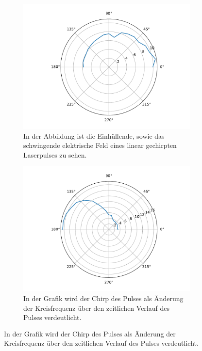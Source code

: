             \FloatBarrier
            \begin{figure}[ht]
                \centering
                \begin{subfigure}[b]{0.45\textwidth}
                    \centering
                    \includegraphics[scale=0.3]{./pictures/H_mol_resonanz_1_2307Hz.pdf}
                    \caption{In der Abbildung ist die Einhüllende, sowie das schwingende elektrische Feld eines linear gechirpten Laserpulses zu sehen.}
                    \label{fig:H_mol_resonanz_1_2307Hz}
                \end{subfigure}
                \hfill
                \centering
                \begin{subfigure}[b]{0.45\textwidth}
                    \centering
                    \includegraphics[scale=0.3]{./pictures/H_mol_resonanz_1_2313Hz.pdf}
                    \caption{In der Grafik wird der Chirp des Pulses als Änderung der Kreisfrequenz über den zeitlichen Verlauf des Pulses verdeutlicht.}
                    \label{fig:H_mol_resonanz_1_2313Hz}
                \end{subfigure}


\end{figure}
